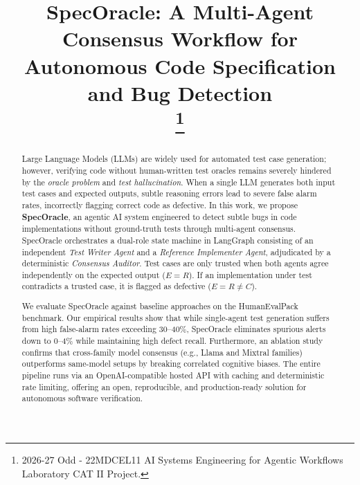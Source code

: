\documentclass[conference]{IEEEtran}
\begin{document}
\title{SpecOracle: A Multi-Agent Consensus Workflow for Autonomous Code Specification and Bug Detection\\
\thanks{2026-27 Odd - 22MDCEL11 AI Systems Engineering for Agentic Workflows Laboratory CAT II Project.}
}

\author{
}

\maketitle

\begin{abstract}
Large Language Models (LLMs) are widely used for automated test case generation; however, verifying code without human-written test oracles remains severely hindered by the \textit{oracle problem} and \textit{test hallucination}. When a single LLM generates both input test cases and expected outputs, subtle reasoning errors lead to severe false alarm rates, incorrectly flagging correct code as defective. In this work, we propose \textbf{SpecOracle}, an agentic AI system engineered to detect subtle bugs in code implementations without ground-truth tests through multi-agent consensus. SpecOracle orchestrates a dual-role state machine in LangGraph consisting of an independent \textit{Test Writer Agent} and a \textit{Reference Implementer Agent}, adjudicated by a deterministic \textit{Consensus Auditor}. Test cases are only trusted when both agents agree independently on the expected output ($E = R$). If an implementation under test contradicts a trusted case, it is flagged as defective ($E = R \neq C$). 

We evaluate SpecOracle against baseline approaches on the HumanEvalPack benchmark. Our empirical results show that while single-agent test generation suffers from high false-alarm rates exceeding 30--40\%, SpecOracle eliminates spurious alerts down to 0--4\% while maintaining high defect recall. Furthermore, an ablation study confirms that cross-family model consensus (e.g., Llama and Mixtral families) outperforms same-model setups by breaking correlated cognitive biases. The entire pipeline runs via an OpenAI-compatible hosted API with caching and deterministic rate limiting, offering an open, reproducible, and production-ready solution for autonomous software verification.
\end{abstract}
\end{document}
